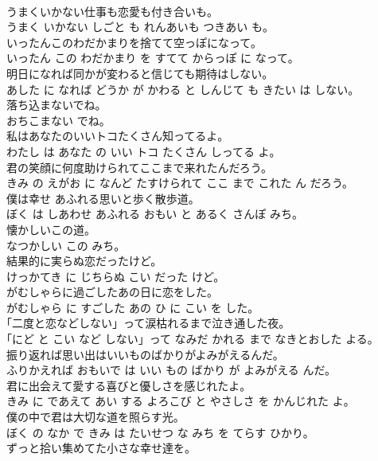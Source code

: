 \documentclass[8pt]{extreport}
\begin{document}
\begin{CJK}{UTF8}{min}
\\	うまくいかない仕事も恋愛も付き合いも。	
\\	うまく いかない しごと も れんあいも つきあい も。	
\\	いったんこのわだかまりを捨てて空っぽになって。	
\\	いったん この わだかまり を すてて からっぽ に なって。	
\\	明日になれば同かが変わると信じても期待はしない。	
\\	あした に なれば どうか が かわる と しんじて も きたい は しない。	
\\	落ち込まないでね。	
\\	おちこまない でね。	
\\	私はあなたのいいトコたくさん知ってるよ。	
\\	わたし は あなた の いい トコ たくさん しってる よ。	
\\	君の笑顔に何度助けられてここまで来れたんだろう。	
\\	きみ の えがお に なんど たすけられて ここ まで これた ん だろう。	
\\	僕は幸せ あふれる思いと歩く散歩道。	
\\	ぼく は しあわせ あふれる おもい と あるく さんぽ みち。	
\\	懐かしいこの道。	
\\	なつかしい この みち。	
\\	結果的に実らぬ恋だったけど。	
\\	けっかてき に じちらぬ こい だった けど。	
\\	がむしゃらに過ごしたあの日に恋をした。	
\\	がむしゃら に すごした あの ひ に こい を した。	
\\	｢二度と恋などしない」って涙枯れるまで泣き通した夜。	
\\	｢にど と こい など しない」って なみだ かれる まで なきとおした よる。	
\\	振り返れば思い出はいいものばかりがよみがえるんだ。	
\\	ふりかえれば おもいで は いい もの ばかり が よみがえる んだ。	
\\	君に出会えて愛する喜びと優しさを感じれたよ。	
\\	きみ に であえて あい する よろこび と やさしさ を かんじれた よ。	
\\	僕の中で君は大切な道を照らす光。	
\\	ぼく の なか で きみ は たいせつ な みち を てらす ひかり。	
\\	ずっと拾い集めてた小さな幸せ達を。	

\end{CJK}
\end{document}
